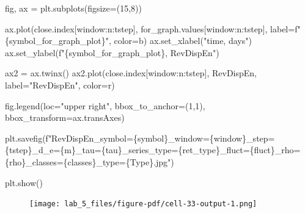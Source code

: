 \documentclass[
  letterpaper,
]{report}
\newenvironment{Shaded}{\begin{snugshade}}{\end{snugshade}}
\newcommand{\DecValTok}[1]{\textcolor[rgb]{0.68,0.00,0.00}{#1}}
\newcommand{\NormalTok}[1]{\textcolor[rgb]{0.00,0.23,0.31}{#1}}
\newcommand{\OperatorTok}[1]{\textcolor[rgb]{0.37,0.37,0.37}{#1}}
\newcommand{\SpecialCharTok}[1]{\textcolor[rgb]{0.37,0.37,0.37}{#1}}
\newcommand{\SpecialStringTok}[1]{\textcolor[rgb]{0.13,0.47,0.30}{#1}}
\newcommand{\StringTok}[1]{\textcolor[rgb]{0.13,0.47,0.30}{#1}}
\begin{document}
\begin{Shaded}
\begin{Highlighting}[]
\NormalTok{fig, ax }\OperatorTok{=}\NormalTok{ plt.subplots(figsize}\OperatorTok{=}\NormalTok{(}\DecValTok{15}\NormalTok{,}\DecValTok{8}\NormalTok{))}

\NormalTok{ax.plot(close.index[window:n:tstep], for\_graph.values[window:n:tstep], label}\OperatorTok{=}\SpecialStringTok{f"}\SpecialCharTok{\{}\NormalTok{symbol\_for\_graph\_plot}\SpecialCharTok{\}}\SpecialStringTok{"}\NormalTok{, color}\OperatorTok{=}\StringTok{\textquotesingle{}b\textquotesingle{}}\NormalTok{)}
\NormalTok{ax.set\_xlabel(}\StringTok{"time, days"}\NormalTok{)}
\NormalTok{ax.set\_ylabel(}\SpecialStringTok{f"}\SpecialCharTok{\{}\NormalTok{symbol\_for\_graph\_plot}\SpecialCharTok{\}}\SpecialStringTok{, RevDispEn"}\NormalTok{)}

\NormalTok{ax2 }\OperatorTok{=}\NormalTok{ ax.twinx()}
\NormalTok{ax2.plot(close.index[window:n:tstep], RevDispEn, label}\OperatorTok{=}\StringTok{"RevDispEn"}\NormalTok{, color}\OperatorTok{=}\StringTok{\textquotesingle{}r\textquotesingle{}}\NormalTok{)}

\NormalTok{fig.legend(loc}\OperatorTok{=}\StringTok{"upper right"}\NormalTok{, bbox\_to\_anchor}\OperatorTok{=}\NormalTok{(}\DecValTok{1}\NormalTok{,}\DecValTok{1}\NormalTok{), bbox\_transform}\OperatorTok{=}\NormalTok{ax.transAxes)}

\NormalTok{plt.savefig(}\SpecialStringTok{f"RevDispEn\_symbol=}\SpecialCharTok{\{}\NormalTok{symbol}\SpecialCharTok{\}}\SpecialStringTok{\_window=}\SpecialCharTok{\{}\NormalTok{window}\SpecialCharTok{\}}\SpecialStringTok{\_step=}\SpecialCharTok{\{}\NormalTok{tstep}\SpecialCharTok{\}}\SpecialStringTok{\_d\_e=}\SpecialCharTok{\{}\NormalTok{m}\SpecialCharTok{\}}\SpecialStringTok{\_tau=}\SpecialCharTok{\{}\NormalTok{tau}\SpecialCharTok{\}}\SpecialStringTok{\_series\_type=}\SpecialCharTok{\{}\NormalTok{ret\_type}\SpecialCharTok{\}}\SpecialStringTok{\_fluct=}\SpecialCharTok{\{}\NormalTok{fluct}\SpecialCharTok{\}}\SpecialStringTok{\_rho=}\SpecialCharTok{\{}\NormalTok{rho}\SpecialCharTok{\}}\SpecialStringTok{\_classes=}\SpecialCharTok{\{}\NormalTok{classes}\SpecialCharTok{\}}\SpecialStringTok{\_type=}\SpecialCharTok{\{}\NormalTok{Type}\SpecialCharTok{\}}\SpecialStringTok{.jpg"}\NormalTok{)}

\NormalTok{plt.show()}
\end{Highlighting}
\end{Shaded}

\begin{figure}[H]

{\centering \texttt{[image: lab\_5\_files/figure-pdf/cell-33-output-1.png]}

}

\end{figure}
\end{document}
